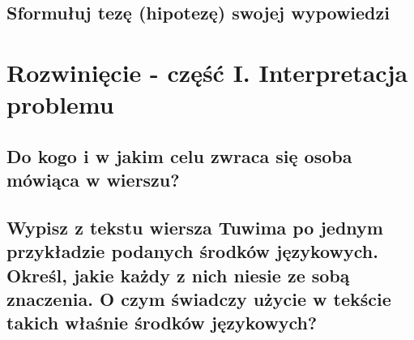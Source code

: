 \documentclass[a4paper]{article}
\begin{document}
\subsection{Sformułuj tezę (hipotezę) swojej wypowiedzi}
\section{Rozwinięcie - część I. Interpretacja problemu}
\subsection{Do kogo i w jakim celu zwraca się osoba mówiąca w wierszu?}
\subsection{Wypisz z tekstu wiersza Tuwima po jednym przykła\-dzie podanych środków językowych. Określ, jakie każ\-dy z nich niesie ze sobą znaczenia. O czym świadczy użycie w tekście takich właśnie środków językowych?}
\end{document}
